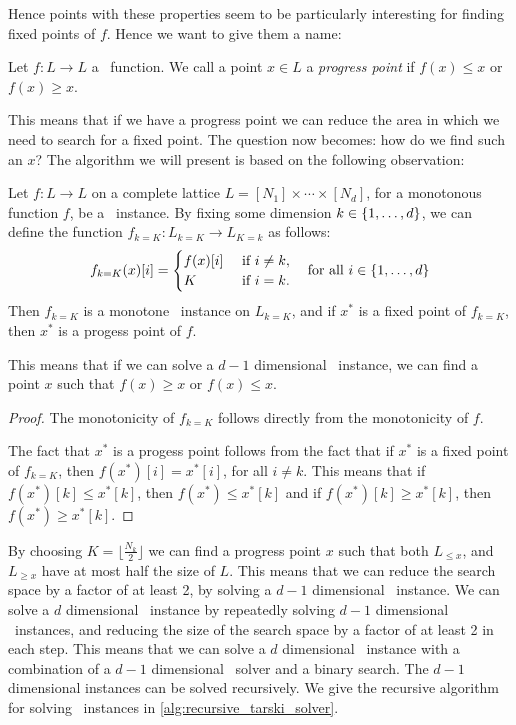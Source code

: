 Hence points with these properties seem to be particularly interesting for finding fixed points of $f$. Hence we want to give them a name:
\begin{definition}
    Let $f : L \rightarrow L$ a \Tarski\ function. We call a point $x \in L$ a \emph{progress point} if $f(x) \leq x$ or $f(x) \geq x$.
\end{definition}
This means that if we have a progress point we can reduce the area in which we need to search for a fixed point. The question now becomes: how do we find such an $x$? The algorithm we will present is based on the following observation:
\begin{remark}
    Let $f : L \rightarrow L$ on a complete lattice ${L = [N_1] \times \cdots \times [N_d]}$, for a monotonous function $f$, be a \Tarski\ instance. By fixing some dimension ${k \in \left\{1, \dots, d\right\}}$, we can define the function ${f_{k=K} : L_{k=K} \rightarrow L_{K=k}}$ as follows:
    \begin{align*}
        f_{k=K}(x)[i] = \begin{cases}
                            f(x)[i] & \text{ if } i \neq k, \\
                            K       & \text{ if } i = k.
                        \end{cases} \quad \text{for all $i \in \left\{1, \dots, d\right\}$}
    \end{align*}
    Then $f_{k=K}$ is a monotone \Tarski\ instance on $L_{k=K}$, and if $x^*$ is a fixed point of $f_{k=K}$, then $x^*$ is a progess point of $f$.
\end{remark}
This means that if we can solve a $d-1$ dimensional \Tarski\ instance, we can find a point $x$ such that $f(x) \geq x$ or $f(x) \leq x$.
\begin{proof}
    The monotonicity of $f_{k=K}$ follows directly from the monotonicity of $f$. \par
    The fact that $x^*$ is a progess point follows from the fact that if $x^*$ is a fixed point of $f_{k=K}$, then $f(x^*)[i] = x^*[i]$, for all $i \neq k$. This means that if $f(x^*)[k] \leq x^*[k]$, then $f(x^*) \leq x^*[k]$ and if $f(x^*)[k] \geq x^*[k]$, then $f(x^*) \geq x^*[k]$.
\end{proof}
By choosing $K = \lfloor \frac{N_k}{2} \rfloor$ we can find a progress point $x$ such that both $L_{\leq x}$, and $L_{\geq x}$ have at most half the size of $L$. This means that we can reduce the search space by a factor of at least 2, by solving a $d-1$ dimensional \Tarski\ instance. We can solve a $d$ dimensional \Tarski\ instance by repeatedly solving $d-1$ dimensional \Tarski\ instances, and reducing the size of the search space by a factor of at least 2 in each step. This means that we can solve a $d$ dimensional \Tarski\ instance with a combination of a $d-1$ dimensional \Tarski\ solver and a binary search. The $d-1$ dimensional instances can be solved recursively. We give the recursive algorithm for solving \Tarski\ instances in \cref{alg:recursive_tarski_solver}.

